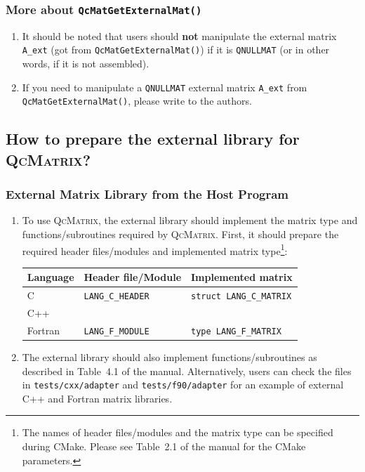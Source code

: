 \documentclass[10pt]{beamer}
\begin{document}
{{\begin{frame}[fragile]
  \frametitle<presentation>{More about \texttt{QcMatGetExternalMat()}}
  \begin{enumerate}
    \item It should be noted that users should \textbf{not} manipulate the external
      matrix \verb|A_ext| (got from \verb|QcMatGetExternalMat()|) if it is
      \verb|QNULLMAT| (or in other words, if it is not assembled).
    \item If you need to manipulate a \verb|QNULLMAT| external matrix \verb|A_ext|
      from \verb|QcMatGetExternalMat()|, please write to the authors.
  \end{enumerate}
\end{frame}

\subsection{How to prepare the external library for \textsc{QcMatrix}?}
\label{section-how-to-host-matrix}

\begin{frame}[fragile]
  \frametitle<presentation>{External Matrix Library from the Host Program}
  \begin{enumerate}
    \item To use \textsc{QcMatrix}, the external library should implement the matrix type
      and functions/subroutines required by \textsc{QcMatrix}. First, it should prepare
      the required header files/modules and implemented matrix type\footnote{The names of
      header files/modules and the matrix type can be specified during CMake. Please see
      Table~2.1 of the manual for the CMake parameters.}:
      \begin{table}[hbtp]
        \centering
        \label{tab-external-req}
        \begin{tabular}{l|l|l}
          \hline\hline
          \textbf{Language} & \textbf{Header file/Module} & \textbf{Implemented matrix}\\
          \hline
          C & \verb|LANG_C_HEADER| & \verb|struct LANG_C_MATRIX|\\
          \hline
          C++ & &\\
          \hline
          Fortran & \verb|LANG_F_MODULE| & \verb|type LANG_F_MATRIX|\\
          \hline\hline
        \end{tabular}
      \end{table}
    \item The external library should also implement functions/subroutines as
      described in Table~4.1 of the manual. Alternatively, users can check the files
      in \verb|tests/cxx/adapter| and \verb|tests/f90/adapter| for an example of
      external C++ and Fortran matrix libraries.
  \end{enumerate}
\end{frame}

}}
\end{document}

